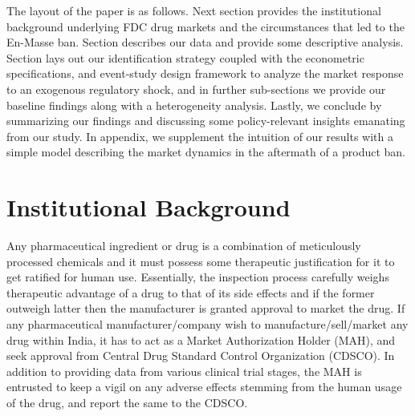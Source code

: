 \documentclass[AER]{AEA}
\theoremstyle{theorem}
\newcommand{\RNum}[1]{\uppercase\expandafter{\romannumeral #1\relax}}
\begin{document}
The layout of the paper is as follows. Next section provides the institutional background underlying FDC drug markets and the circumstances that led to the En-Masse ban. Section \RNum{3} describes our data and provide some descriptive analysis. Section \RNum{4} lays out our identification strategy coupled with the econometric specifications, and event-study design framework to analyze the market response to an exogenous regulatory shock, and in further sub-sections we provide our baseline findings along with a heterogeneity analysis. Lastly, we conclude by summarizing our findings and discussing some policy-relevant insights emanating from our study. In appendix, we supplement the intuition of our results with a simple model describing the market dynamics in the aftermath of a product ban.


\section{Institutional Background}

Any pharmaceutical ingredient or drug is a combination of meticulously processed chemicals and it must possess some therapeutic justification for it to get ratified for human use. Essentially, the inspection process carefully weighs therapeutic advantage of a drug to that of its side effects and if the former outweigh latter then the manufacturer is granted approval to market the drug. If any pharmaceutical manufacturer/company wish to manufacture/sell/market any drug within India, it has to act  as a Market Authorization Holder (MAH), and seek approval from Central Drug Standard Control Organization (CDSCO). In addition to providing  data from various clinical trial stages, the MAH is entrusted to keep a vigil on any adverse effects stemming from the human usage of the drug, and report the same to the CDSCO.
\end{document}
